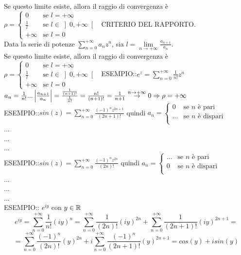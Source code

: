 Se questo limite esiste, allora il raggio di convergenza è 
$\rho =
	\begin{cases}
		0				&	\text{se }l=+\infty\\
		\frac{1}{l} 	&	\text{se }l\in\left]0,+\infty\right[\\
		+\infty 		& 	\text{se }l=0
	\end{cases}
$
\proposition CRITERIO DEL RAPPORTO.\\
Data la serie di potenze $\sum\limits_{n=0}^{+\infty}a_nz^n$, sia $l=\lim\limits_{n\to+\infty}\frac{a_{n+1}}{a_n}$.\\
Se questo limite esiste, allora il raggio di convergenza è 
$\rho =
\begin{cases}
0				&	\text{se }l=+\infty\\
\frac{1}{l} 	&	\text{se }l\in\left]0,+\infty\right[\\
+\infty 		& 	\text{se }l=0
\end{cases}
$
ESEMPIO::$e^z=\sum\limits_{n=0}^{+\infty}\frac{1}{n!}z^n$\\
$a_n=\frac{1}{n!} ...  \left|\frac{a_{n+1}}{a_n}\right|=\frac{\frac{1}{(n+1)!}}{\frac{1}{n!}}=\frac{n!}{(n+1)!}=\frac{1}{n+1}\overset{n\to+\infty}{\to}0 \Rightarrow \rho=+\infty$\\
ESEMPIO::$sin(z)=\sum\limits_{n=0}^{+\infty}\frac{(-1)^nz^{2n+1}}{(2n+1)!}$ quindi 
$a_n =
\begin{cases}
0		&	\text{se }n\text{ è pari}\\
...		&	\text{se }n\text{ è dispari}\\
\end{cases}
$\\
...\\
...\\
...\\
ESEMPIO::$sin(z)=\sum\limits_{n=0}^{+\infty}\frac{(-1)^nz^{2n}}{(2n)!}$ quindi 
$a_n =
\begin{cases}
...		&	\text{se }n\text{ è pari}\\
0		&	\text{se }n\text{ è dispari}\\
\end{cases}
$\\
...\\
...\\
...\\
ESEMPIO:: $e^{iy}$ con $y\in \mathbb{R}$ 
$$e^{iy} = \sum\limits_{n=0}^{+\infty}\frac{1}{n!}(iy)^n = \sum\limits_{n=0}^{+\infty}\frac{1}{(2n)!}(iy)^{2n} + \sum\limits_{n=0}^{+\infty}\frac{1}{(2n+1)!}(iy)^{2n+1} = $$
$$ = \sum\limits_{n=0}^{+\infty}\frac{(-1)^n}{(2n)!}(y)^{2n} + i\sum\limits_{n=0}^{+\infty}\frac{(-1)^n}{(2n+1)!}(y)^{2n+1} = cos(y)+isin(y)$$
